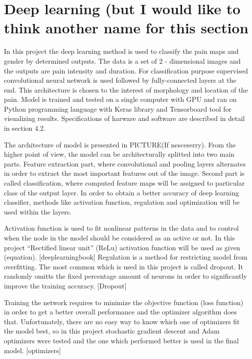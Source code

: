 \section{Deep learning (but I would like to think another name for this section}
In this project the deep learning method is used to classify the pain maps and gender by determined outputs. The data is a set of 2 - dimensional images and the outputs are pain intensity and duration. For classification purpose supervised convolutional neural network is used followed by fully-connected layers at the end. This architecture is chosen to the interest of morphology and location of the pain. Model is trained and tested on a single computer with GPU and ran on Python programming language with Keras library and Tensorboard tool for visualizing results. Specifications of harware and software are described in detail in section 4.2.

\noindent
The architecture of model is presented in PICTURE(If nesceserry). From the higher point of view, the model can be architecturally splitted into two main parts. Feature extraction part, where convolutional and pooling layers alternates in order to extract the most important features out of the image. Second part is called classification, where computed feature maps will be assigned to particular class of the output layer. In order to obtain a better accuracy of deep learning classifier, methods like activation function, regulation and optimization will be used within the layers.

\noindent
Activation function is used to fit nonlinear patterns in the data and to control when the node in the model should be considered as an active or not.  In this project “Rectified linear unit” (ReLu) activation function will be used as given (equation). [deeplearningbook]
\noindent
Regulation is a method for restricting model from overfitting. The most common which is used in this project is called dropout. It randomly omitts the fixed percentage amount of neurons in order to significantly improve the training accuracy. [Dropout]

\noindent
Training the network requires to minimize the objective function (loss function) in order to get a better overall performance and the optimizer algorithm does that. Unfortunately, there are no easy way to know which one of optimizers fit the model best, so in this project stochastic gradient descent and Adam optimizers were tested and the one which performed better is used in the final model. [optimizers]

